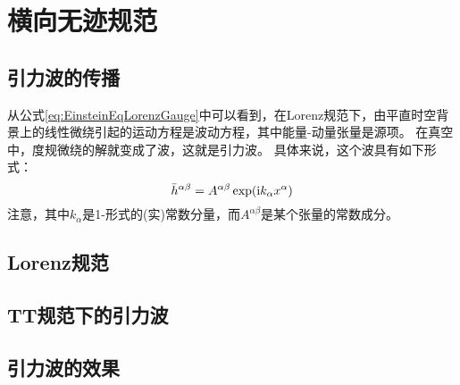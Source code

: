\section{横向无迹规范}
\subsection{引力波的传播}
从公式\ref{eq:EinsteinEqLorenzGauge}中可以看到，在Lorenz规范下，由平直时空背景上的线性微绕引起的运动方程是波动方程，其中能量-动量张量是源项。
在真空中，度规微绕的解就变成了波，这就是引力波。
具体来说，这个波具有如下形式：
\begin{equation}\label{eq:GWsolution} 
  \bar{h}^{\alpha\beta} =  A^{\alpha\beta} \exp({\rm i} k_\alpha x^\alpha)
\end{equation}
注意，其中${k_\alpha}$是1-形式的(实)常数分量，而$A^{\alpha\beta}$是某个张量的常数成分。



\subsection{Lorenz规范}

\subsection{TT规范下的引力波}

\subsection{引力波的效果}
